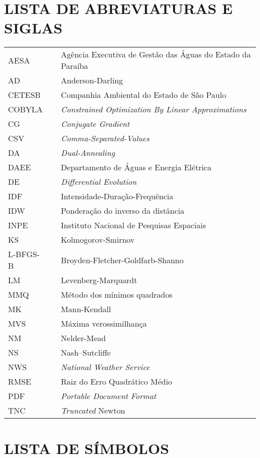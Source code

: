 \chapter*{LISTA DE ABREVIATURAS E SIGLAS}
\thispagestyle{empty}
\begin{table}[h!]
	\flushleft
	\renewcommand{\arraystretch}{1.8}
	\begin{tabular}{lcl}
AESA && Agência Executiva de Gestão das Águas do Estado da Paraíba\\
AD &&Anderson-Darling\\
CETESB &&Companhia Ambiental do Estado de São Paulo\\
COBYLA &&\textit{Constrained Optimization By Linear Approximations}\\
CG &&\textit{Conjugate Gradient}\\
CSV &&\textit{Comma-Separated-Values}\\
DA &&\textit{Dual-Annealing}\\
DAEE &&Departamento de Águas e Energia Elétrica\\
DE &&\textit{Differential Evolution}\\
IDF &&Intensidade-Duração-Frequência\\
IDW &&Ponderação do inverso da distância\\
INPE &&Instituto Nacional de Pesquisas Espaciais\\
KS &&Kolmogorov-Smirnov\\
L-BFGS-B &&Broyden-Fletcher-Goldfarb-Shanno\\
LM &&Levenberg-Marquardt\\
MMQ &&Método dos mínimos quadrados\\
MK &&Mann-Kendall\\
MVS &&Máxima verossimilhança\\
NM &&Nelder-Mead\\
NS &&Nash–Sutcliffe\\
NWS &&\textit{National Weather Service}\\
RMSE &&Raiz do Erro Quadrático Médio\\
PDF &&\textit{Portable Document Format}\\
TNC &&\textit{Truncated} Newton\\

\end{tabular} 
\end{table}
\newpage

\chapter*{LISTA DE SÍMBOLOS}
\thispagestyle{empty}

